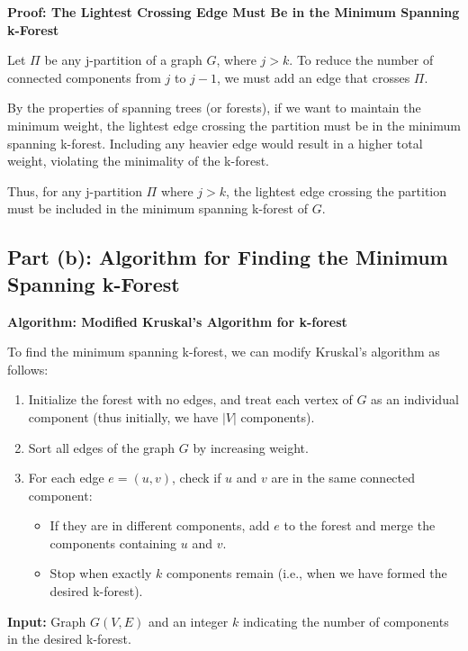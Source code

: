 \documentclass[11pt]{article}
\begin{document}
\textbf{Proof: The Lightest Crossing Edge Must Be in the Minimum Spanning k-Forest}

Let \( \Pi \) be any j-partition of a graph \( G \), where \( j > k \). To reduce the number of connected components from \( j \) to \( j-1 \), we must add an edge that crosses \( \Pi \).

By the properties of spanning trees (or forests), if we want to maintain the minimum weight, the lightest edge crossing the partition must be in the minimum spanning k-forest. Including any heavier edge would result in a higher total weight, violating the minimality of the k-forest.

Thus, for any j-partition \( \Pi \) where \( j > k \), the lightest edge crossing the partition must be included in the minimum spanning k-forest of \( G \).

\subsection*{Part (b): Algorithm for Finding the Minimum Spanning k-Forest}

\textbf{Algorithm: Modified Kruskal's Algorithm for k-forest}

To find the minimum spanning k-forest, we can modify Kruskal's algorithm as follows:

\begin{enumerate}
    \item Initialize the forest with no edges, and treat each vertex of \( G \) as an individual component (thus initially, we have \( |V| \) components).
    
    \item Sort all edges of the graph \( G \) by increasing weight.
    
    \item For each edge \( e = (u, v) \), check if \( u \) and \( v \) are in the same connected component:
    \begin{itemize}
        \item If they are in different components, add \( e \) to the forest and merge the components containing \( u \) and \( v \).
        \item Stop when exactly \( k \) components remain (i.e., when we have formed the desired k-forest).
    \end{itemize}
\end{enumerate}

\textbf{Input:} Graph \( G(V, E) \) and an integer \( k \) indicating the number of components in the desired k-forest.
\end{document}
